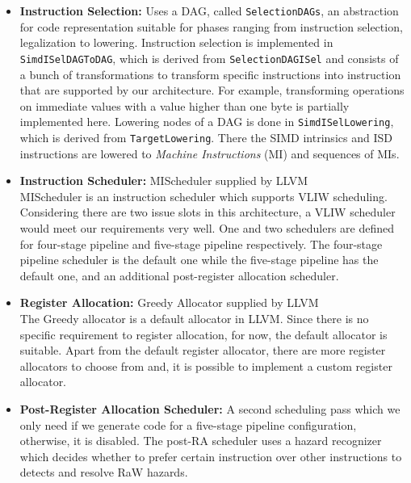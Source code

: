 \begin{itemize}
	\item \textbf{Instruction Selection:} Uses a DAG, called \texttt{SelectionDAGs}, an abstraction for code representation suitable for phases ranging from instruction selection, legalization to lowering. Instruction selection is implemented in  \texttt{SimdISelDAGToDAG}, which is derived from \texttt{SelectionDAGISel} and consists of a bunch of transformations to transform specific instructions into instruction that are supported by our architecture. For example, transforming operations on immediate values with a value higher than one byte is partially implemented here. Lowering nodes of a DAG is done in \texttt{SimdISelLowering}, which is derived from \texttt{TargetLowering}. There the SIMD intrinsics and ISD instructions are lowered to \emph{Machine Instructions} (MI) and sequences of MIs.
	\item \textbf{Instruction Scheduler:} MIScheduler supplied by LLVM\\
MIScheduler is an instruction scheduler which supports VLIW scheduling. Considering there are two issue slots in this architecture, a VLIW scheduler would meet our requirements very well. One and two schedulers are defined for four-stage pipeline and five-stage pipeline respectively. The four-stage pipeline scheduler is the default one while the five-stage pipeline has the default one, and an additional post-register allocation scheduler.
	\item \textbf{Register Allocation:} Greedy Allocator supplied by LLVM\\
	The Greedy allocator is a default allocator in LLVM. Since there is no specific requirement to register allocation, for now, the default allocator is suitable. Apart from the default register allocator, there are more register allocators to choose from and, it is possible to implement a custom register allocator.
	\item \textbf{Post-Register Allocation Scheduler:} A second scheduling pass which we only need if we generate code for a five-stage pipeline configuration, otherwise, it is disabled. The post-RA scheduler uses a hazard recognizer which decides whether to prefer certain instruction over other instructions to detects and resolve RaW hazards.

\end{itemize}
